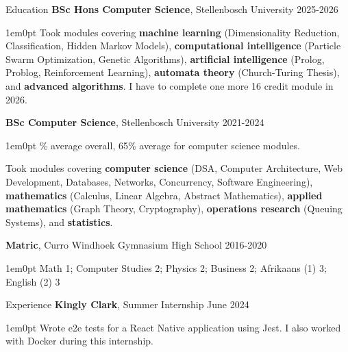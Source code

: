 \documentclass{wle_cv}
\begin{document}
\begin{cvsection}{Education}
  \noindent\textbf{BSc Hons Computer Science}, Stellenbosch University \hfill 2025-2026
  \begin{adjustwidth}{1em}{0pt}
    Took modules covering \textbf{machine learning} (Dimensionality Reduction,
    Classification, Hidden Markov Models), \textbf{computational intelligence}
    (Particle Swarm Optimization, Genetic Algorithms), \textbf{artificial
    intelligence} (Prolog, Problog, Reinforcement Learning), \textbf{automata
    theory} (Church-Turing Thesis), and \textbf{advanced algorithms}. I have to
    complete one more 16 credit module in 2026.
  \end{adjustwidth}

  \vspace{0.5em}

  \noindent\textbf{BSc Computer Science}, Stellenbosch University \hfill 2021-2024
  \begin{adjustwidth}{1em}{0pt}
    \% average overall, 65\% average for computer science modules.

    \noindent Took modules covering \textbf{computer science} (DSA, Computer
    Architecture, Web Development, Databases, Networks, Concurrency, Software
    Engineering), \textbf{mathematics} (Calculus, Linear Algebra, Abstract
    Mathematics), \textbf{applied mathematics} (Graph Theory, Cryptography),
    \textbf{operations research} (Queuing Systems), and \textbf{statistics}.
  \end{adjustwidth}

  \vspace{0.5em}

  \noindent\textbf{Matric}, Curro Windhoek Gymnasium High School \hfill
  2016-2020
  \begin{adjustwidth}{1em}{0pt}
    Math 1; Computer Studies 2; Physics 2; Business 2; Afrikaans (1) 3; English
    (2) 3
  \end{adjustwidth}
\end{cvsection}

\begin{cvsection}{Experience}
  \noindent\textbf{Kingly Clark}, Summer Internship \hfill June 2024
  \begin{adjustwidth}{1em}{0pt}
    Wrote e2e tests for a React Native application using Jest. I also worked
    with Docker during this internship.
  \end{adjustwidth}
\end{cvsection}
\end{document}
